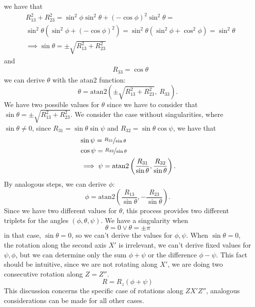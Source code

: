 \documentclass[10pt, letterpaper]{report}
\begin{document}
we have that \begin{align}
    &R_{13}^2+R_{23}^2=\sin^2\phi\sin^2\theta+(-\cos\phi)^2\sin^2\theta=\\ 
    &\sin^2\theta(\sin^2\phi+(-\cos\phi)^2)= \sin^2\theta(\sin^2\phi+\cos^2\phi)=\sin^2\theta\\ &\implies
    \sin\theta=\pm\sqrt{R_{13}^2+R_{23}^2}
\end{align}
and\begin{align}
    &R_{33}=\cos\theta  
\end{align}
we can derive $\theta$ with the atan2 function:\begin{equation}
    \theta=\text{atan2}\left(
        \pm\sqrt{R_{13}^2+R_{23}^2}, \ R_{33}
    \right).
\end{equation}
We have two possible values for $\theta$ since we have to consider that $\sin\theta=\pm\sqrt{R_{13}^2+R_{23}^2}$.
We consider the case without singularities, where $\sin\theta\ne 0$, since $R_{31}=\sin\theta\sin\psi$ and $R_{32}=\sin\theta\cos\psi$, we have that\begin{align}
    &\sin\psi=\nicefrac{R_{31}}{\sin\theta}\\ 
    &\cos\psi=\nicefrac{R_{32}}{\sin\theta}\\ 
    &\implies \psi=\text{atan2}\left(
        \frac{R_{31}}{\sin\theta}, \frac{R_{32}}{\sin\theta}
    \right).
\end{align}
By analogous steps, we can derive $\phi$:\begin{equation}
     \phi=\text{atan2}\left(
        \frac{R_{13}}{\sin\theta},- \frac{R_{23}}{\sin\theta}
    \right).
\end{equation}
Since we have two different values for $\theta$, this process provides two different triplets for the angles $(\phi,\theta,\psi)$. We have a singularity when\begin{equation}
    \theta=0\lor \theta=\pm\pi
\end{equation}
in that case, $\sin\theta=0$, so we can't derive the values for $\phi,\psi$. When $\sin\theta=0$, the rotation along the second axis $X'$ is irrelevant, we can't derive fixed values for $\psi,\phi$, but we can determine only the sum $\phi+\psi$ or the difference $\phi-\psi$. This fact should be intuitive, since we are not rotating along $X'$, we are doing two consecutive rotation along $Z=Z''$.
$$R=R_z(\phi+\psi)$$
This discussion concerns the specific case of rotations along $ZX'Z''$, analogous considerations can be made for all other cases.
\end{document}
